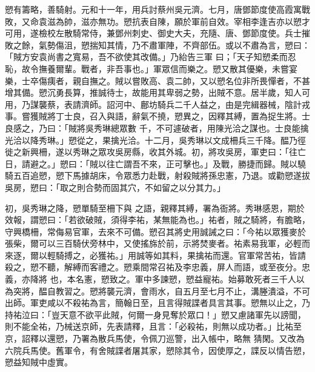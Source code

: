 \begin{pinyinscope}
 愬有籌略，善騎射。元和十一年，用兵討蔡州吳元濟。七月，唐鄧節度使高霞寓戰敗，又命袁滋為帥，滋亦無功。愬抗表自陳，願於軍前自效。宰相李逢吉亦以愬才可用，遂檢校左散騎常侍，兼鄧州刺史、御史大夫，充隨、唐、鄧節度使。兵士摧敗之餘，氣勢傷沮，愬揣知其情，乃不肅軍陣，不齊部伍。或以不肅為言，愬曰：「賊方安袁尚書之寬易，吾不欲使其改備。」乃紿告三軍
 曰；「天子知愬柔而忍恥，故令撫養爾輩。戰者，非吾事也。」軍眾信而樂之。愬又散其優樂，未嘗宴樂，士卒傷痍者，親自撫之。賊以嘗敗高、袁二帥，又以愬名位非所畏憚者，不甚增其備。愬沉勇長算，推誠待士，故能用其卑弱之勢，出賊不意。居半歲，知人可用，乃謀襲蔡，表請濟師。詔河中、鄜坊騎兵二千人益之，由是完緝器械，陰計戎事。嘗獲賊將丁士良，召入與語，辭氣不撓，愬異之，因釋其縛，置為捉生將。士良感之，乃曰：「賊將吳秀琳總眾數
 千，不可遽破者，用陳光洽之謀也。士良能擒光洽以降秀琳。」愬從之，果擒光洽。十二月，吳秀琳以文成柵兵三千降。醖乃徑徙之新興柵，遂以秀琳之眾攻吳房縣，收其外城。初，將攻吳房，軍吏曰：「往亡日，請避之。」愬曰：「賊以往亡謂吾不來，正可擊也。」及戰，勝捷而歸。賊以驍騎五百追愬，愬下馬據胡床，令眾悉力赴戰，射殺賊將孫忠憲，乃退。或勸愬遂拔吳房，愬曰：「取之則合勢而固其穴，不如留之以分其力。」



 初，吳秀琳之降，愬單騎至柵下與
 之語，親釋其縛，署為衙將。秀琳感恩，期於效報，謂愬曰：「若欲破賊，須得李祐，某無能為也。」祐者，賊之騎將，有膽略，守興橋柵，常侮易官軍，去來不可備。愬召其將史用誠誡之曰：「今祐以眾獲麥於張柴，爾可以三百騎伏旁林中，又使搖旆於前，示將焚麥者。祐素易我軍，必輕而來逐，爾以輕騎搏之，必獲祐。」用誠等如其料，果擒祐而還。官軍常苦祐，皆請殺之，愬不聽，解縛而客禮之。愬乘間常召祐及李忠義，屏人而語，或至夜分。忠義，亦降將
 也，本名憲，愬致之。軍中多諫愬，愬益寵祐。始募敢死者三千人以為突將，醖自教習之。愬將襲元濟，會雨水，自五月至七月不止，溝塍潰溢，不可出師。軍吏咸以不殺祐為言，簡翰日至，且言得賊諜者具言其事。愬無以止之，乃持祐泣曰：「豈天意不欲平此賊，何爾一身見奪於眾口！」愬又慮諸軍先以謗聞，則不能全祐，乃械送京師，先表請釋，且言：「必殺祐，則無以成功者。」比祐至京，詔釋以還愬，乃署為散兵馬使，令佩刀巡警，出入帳中，略無
 猜閑。又改為六院兵馬使。舊軍令，有舍賊諜者屠其家，愬除其令，因使厚之，諜反以情告愬，愬益知賊中虛實。




\end{pinyinscope}
